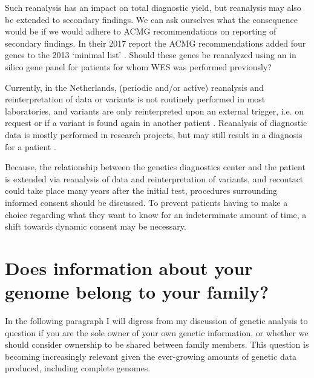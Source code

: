 Such reanalysis has an impact on total diagnostic yield, but reanalysis may also be extended to secondary findings. 
We can ask ourselves what the consequence would be if we would adhere to ACMG recommendations on reporting of secondary findings. 
In their 2017 report the ACMG recommendations added four genes to the 2013 ‘minimal list’ \cite{Kalia_2016}. 
Should these genes be reanalyzed using an in silico gene panel for patients for whom WES was performed previously? 

Currently, in the Netherlands, (periodic and/or active) reanalysis and reinterpretation of data or variants is not routinely performed in most laboratories, and variants are only reinterpreted upon an external trigger, i.e. on request or if a variant is found again in another patient \cite{El_Mecky_2019}.
Reanalysis of diagnostic data is mostly performed in research projects, but may still result in a diagnosis for a patient \cite{RadboudUMC_2018,SolveRD_nd}. 

Because, the relationship between the genetics diagnostics center and the patient is extended via reanalysis of data and reinterpretation of variants, and recontact could take place many years after the initial test, procedures surrounding informed consent should be discussed. 
To prevent patients having to make a choice regarding what they want to know for an indeterminate amount of time, a shift towards dynamic consent \cite{Kaye_2015} may be necessary.

\section[Does your genomic information belong to your family? ]{Does information about your genome belong to your family? }
In the following paragraph I will digress from my discussion of genetic analysis to question if you are the sole owner of your own genetic information, or whether we should consider ownership to be shared between family members. 
This question is becoming increasingly relevant given the ever-growing amounts of genetic data produced, including complete genomes. 

